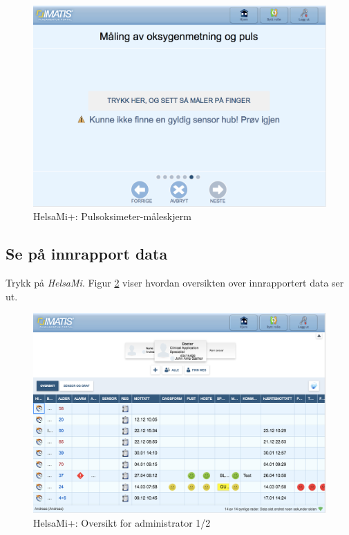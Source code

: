 \begin{figure}
\includegraphics[width=1.0\textwidth,center]{fig/helsami/pulsoksimeter_maaling}
\caption{HelsaMi+: Pulsoksimeter-måleskjerm}
\label{fig:helsami_pulsoksimeter_maaling}
\end{figure}

\subsection{Se på innrapport data}
Trykk på \textit{HelsaMi}. Figur \ref{fig:helsami_admin1} viser hvordan oversikten over innrapportert data ser ut.

\begin{figure}
\includegraphics[width=1.0\textwidth,center]{fig/helsami/admin_oversikt}
\caption{HelsaMi+: Oversikt for administrator 1/2}
\label{fig:helsami_admin1}
\end{figure}

